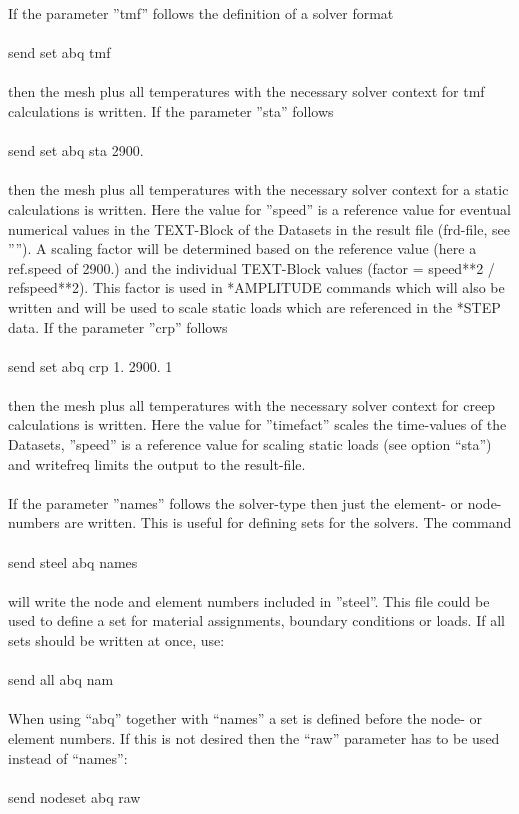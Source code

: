 \documentclass{article}
\begin{document}
If the parameter ''tmf'' follows the definition of a solver format\\\\send set abq tmf\\\\then the mesh plus all temperatures with the necessary solver context for tmf calculations is written. If the parameter ''sta'' follows \\\\send set abq sta 2900.\\\\then the mesh plus all temperatures with the necessary solver context for a static calculations is written. Here the value for ''speed'' is a reference value for eventual numerical values in the TEXT-Block of the Datasets in the result file (frd-file, see ''''). A scaling factor will be determined based on the reference value (here a ref.speed of 2900.) and the individual TEXT-Block values (factor = speed**2 / refspeed**2). This factor is used in *AMPLITUDE commands which will also be written and will be used to scale static loads which are referenced in the *STEP data. If the parameter ''crp'' follows \\\\send set abq crp 1. 2900. 1\\\\then the mesh plus all temperatures with the necessary solver context for creep calculations is written. Here the value for ''timefact'' scales the time-values of the Datasets, ''speed'' is a reference value for scaling static loads (see option ``sta'') and writefreq limits the output to the result-file.\\\\
If the parameter ''names'' follows the solver-type then just the element- or node-numbers are written. This is useful for defining sets for the solvers. The command\\\\send steel abq names\\\\will write the node and element numbers included in ''steel''. This file could be used to define a set for material assignments, boundary conditions or loads. If all sets should be written at once, use:\\\\send all abq nam\\\\When using ``abq'' together with ``names'' a set is defined before the node- or element numbers. If this is not desired then the ``raw'' parameter has to be used instead of ``names'':
\\\\send nodeset abq raw\\
\end{document}

